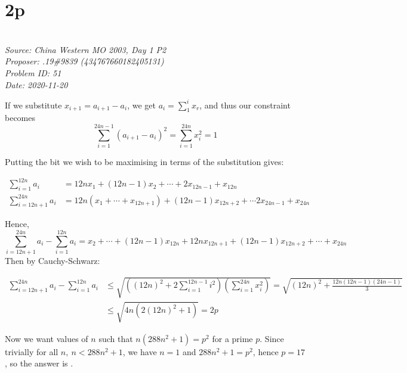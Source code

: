 \documentclass[titlepage=true]{scrartcl}
\begin{document}
\newpage 

\section{2p}

\SSbreak\\
\emph{Source: China Western MO 2003, Day 1 P2}\\
\emph{Proposer: .19\#9839 (434767660182405131)}\\
\emph{Problem ID: 51}\\
\emph{Date: 2020-11-20}\\
\SSbreak

\bigskip

\begin{solution}\hfil\medskip

    If we substitute \(x_{i+1}=a_{i+1}-a_i\), we get \(a_i=\sum_1^i x_r\), and thus our constraint becomes 
    \begin{equation*}
        \sum_{i=1}^{24n-1}(a_{i+1}-a_i)^2=\sum_{i=1}^{24n}x^2_i=1
    \end{equation*}
    
    Putting the bit we wish to be maximising in terms of the substitution gives:

    \begin{align*}
        \sum_{i=1}^{12n}a_i&=12nx_1+(12n-1)x_2+\cdots+2x_{12n-1}+x_{12n}\\
        \sum_{i=12n+1}^{24n}a_i&=12n(x_1+\cdots+x_{12n+1})+(12n-1)x_{12n+2}+\cdots 2x_{24n-1}+x_{24n}
    \end{align*}

    Hence, 
    \begin{equation*}
        \sum_{i=12n+1}^{24n}a_i-\sum_{i=1}^{12n}a_i=x_2+\cdots+(12n-1)x_{12n}+12nx_{12n+1}+(12n-1)x_{12n+2}+\cdots+x_{24n}
    \end{equation*}
    Then by Cauchy-Schwarz: 

    \begin{align*}
        \sum_{i=12n+1}^{24n}a_i-\sum_{i=1}^{12n}a_i&\leq \sqrt{\left((12n)^2+2\sum_{i=1}^{12n-1}i^2\right)\left(\sum_{i=1}^{24n}x_i^2\right)}=\sqrt{(12n)^2+\frac{12n(12n-1)(24n-1)}{3}}\\
        &\leq\sqrt{4n(2(12n)^2+1)}=2p
    \end{align*}

    Now we want values of \(n\) such that \(n(288n^2+1)=p^2\) for a prime \(p\). Since trivially for all \(n,\ n<288n^2+1\), we have \(n=1\) and \(288n^2+1=p^2\), hence \(p=17\), so the answer is .
    \end{solution}
\end{document}

